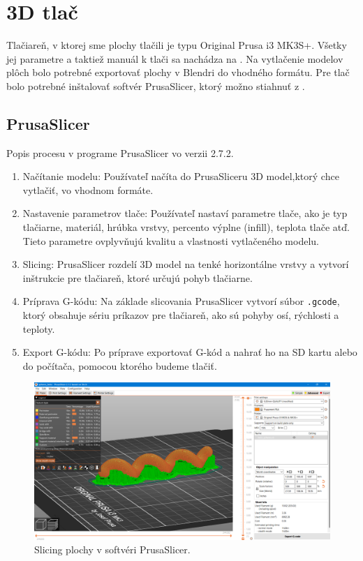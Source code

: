 \section{3D tlač}
Tlačiareň, v ktorej sme plochy tlačili je typu Original Prusa i3 MK3S+. Všetky jej parametre a taktiež manuál k tlači sa nachádza na \cite{PrusaManual}. Na vytlačenie modelov plôch bolo potrebné exportovať plochy v Blendri do vhodného formátu. Pre tlač bolo potrebné inštalovať softvér PrusaSlicer, ktorý možno stiahnuť z \cite{PrusaSlicer}.
\subsection{PrusaSlicer}
Popis procesu v programe PrusaSlicer vo verzii 2.7.2.
\begin{enumerate}
\item Načítanie modelu: Používateľ načíta do PrusaSliceru 3D model,ktorý chce vytlačiť, vo vhodnom formáte.

\item Nastavenie parametrov tlače: Používateľ nastaví parametre tlače, ako je typ tlačiarne, materiál, hrúbka vrstvy, percento výplne (infill), teplota tlače atď. Tieto parametre ovplyvňujú kvalitu a vlastnosti vytlačeného modelu.

\item Slicing: PrusaSlicer rozdelí 3D model na tenké horizontálne vrstvy a vytvorí inštrukcie pre tlačiareň, ktoré určujú pohyb tlačiarne. 

\item Príprava G-kódu: Na základe slicovania PrusaSlicer vytvorí súbor \verb|.gcode|, ktorý obsahuje sériu príkazov pre tlačiareň, ako sú pohyby osí, rýchlosti a teploty.

\item Export G-kódu: Po príprave exportovať G-kód a nahrať ho na SD kartu alebo do počítača, pomocou ktorého budeme tlačiť.
\end{enumerate}

\begin{figure}[h]
	\centering
	\includegraphics[width=\textwidth]{images/prusaslicer.png}
	\caption[Softvér PrusaSlicer.]{Slicing plochy v softvéri PrusaSlicer.}
	\label{fig:prusaslicer}
\end{figure}

